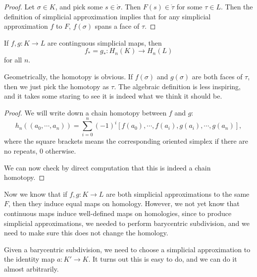 \documentclass[a4paper]{article}
\begin{document}
\begin{proof}
  Let $\sigma \in K$, and pick some $s \in \mathring{\sigma}$. Then $F(s) \in \mathring{\tau}$ for some $\tau \in L$. Then the definition of simplicial approximation implies that for any simplicial approximation $f$ to $F$, $f(\sigma)$ spans a face of $\tau$.
\end{proof}

\begin{lemma}
  If $f, g: K \to L$ are continguous simplicial maps, then
  \[
    f_* = g_* : H_n(K) \to H_n(L)
  \]
  for all $n$.
\end{lemma}

Geometrically, the homotopy is obvious. If $f(\sigma)$ and $g(\sigma)$ are both faces of $\tau$, then we just pick the homotopy as $\tau$. The algebraic definition is less inspiring, and it takes some staring to see it is indeed what we think it should be.
\begin{proof}
  We will write down a chain homotopy between $f$ and $g$:
  \[
    h_n((a_0, \cdots, a_n)) = \sum_{i = 0}^n (-1)^i [f(a_0), \cdots, f(a_i), g(a_i), \cdots, g(a_n)],
  \]
  where the square brackets means the corresponding oriented simplex if there are no repeats, $0$ otherwise.

  We can now check by direct computation that this is indeed a chain homotopy.
\end{proof}

Now we know that if $f, g:K \to L$ are both simplicial approximations to the same $F$, then they induce equal maps on homology. However, we not yet know that continuous maps induce well-defined maps on homologies, since to produce simplicial approximations, we needed to perform barycentric subdivision, and we need to make sure this does not change the homology.
\begin{center}
\end{center}
Given a barycentric subdivision, we need to choose a simplicial approximation to the identity map $a: K' \to K$. It turns out this is easy to do, and we can do it almost arbitrarily.
\end{document}
